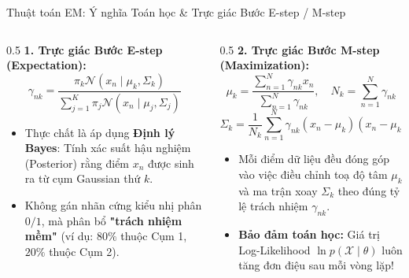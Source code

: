 \documentclass[aspectratio=169,10pt]{beamer}
\begin{document}
\begin{frame}{Thuật toán EM: Ý nghĩa Toán học \& Trực giác Bước E-step / M-step}
  \small
  \begin{columns}[T]
    \begin{column}{0.5\textwidth}
      \textbf{1. Trực giác Bước E-step (Expectation):}
      $$\gamma_{nk} = \frac{\pi_k \mathcal{N}(x_n \mid \mu_k, \Sigma_k)}{\sum_{j=1}^K \pi_j \mathcal{N}(x_n \mid \mu_j, \Sigma_j)}$$
      \begin{itemize}\setlength{\itemsep}{1.5pt}
        \item Thực chất là áp dụng \textbf{Định lý Bayes}: Tính xác suất hậu nghiệm (Posterior) rằng điểm $x_n$ được sinh ra từ cụm Gaussian thứ $k$.
        \item Không gán nhãn cứng kiểu nhị phân $0/1$, mà phân bổ \textbf{"trách nhiệm mềm"} (ví dụ: $80\%$ thuộc Cụm 1, $20\%$ thuộc Cụm 2).
      \end{itemize}
    \end{column}
    \begin{column}{0.5\textwidth}
      \textbf{2. Trực giác Bước M-step (Maximization):}
      $$\mu_k = \frac{\sum_{n=1}^N \gamma_{nk} x_n}{\sum_{n=1}^N \gamma_{nk}}, \quad N_k = \sum_{n=1}^N \gamma_{nk}$$
      $$\Sigma_k = \frac{1}{N_k}\sum_{n=1}^N \gamma_{nk} (x_n - \mu_k)(x_n - \mu_k)^T$$
      \begin{itemize}\setlength{\itemsep}{1.5pt}
        \item Mỗi điểm dữ liệu đều đóng góp vào việc điều chỉnh toạ độ tâm $\mu_k$ và ma trận xoay $\Sigma_k$ theo đúng tỷ lệ trách nhiệm $\gamma_{nk}$.
        \item \textbf{Bảo đảm toán học:} Giá trị Log-Likelihood $\ln p(\mathcal{X} \mid \theta)$ luôn tăng đơn điệu sau mỗi vòng lặp!
      \end{itemize}
    \end{column}
  \end{columns}
\end{frame}
\end{document}
